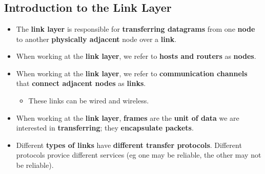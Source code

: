 \documentclass{article}
\begin{document}
    \section*{}

    \subsection*{Introduction to the Link Layer}
    \begin{itemize}
        \item The \textbf{link layer} is responsible for \textbf{transferring datagrams} from one \textbf{node} to another \textbf{physically adjacent} node over a \textbf{link}.
        \item When working at the \textbf{link layer}, we refer to \textbf{hosts and routers} as \textbf{nodes}.
        \item When working at the \textbf{link layer}, we refer to \textbf{communication channels} that \textbf{connect adjacent nodes} as \textbf{links}.
        \begin{itemize}
            \item These links can be wired and wireless.
        \end{itemize}
        \item When working at the \textbf{link layer}, \textbf{frames} are the \textbf{unit of data} we are interested in \textbf{transferring}; they \textbf{encapsulate packets}.
        \item Different \textbf{types of links} have \textbf{different transfer protocols}. Different protocols provice different services (eg one may be reliable, the other may not be reliable).
    \end{itemize}
\end{document}
